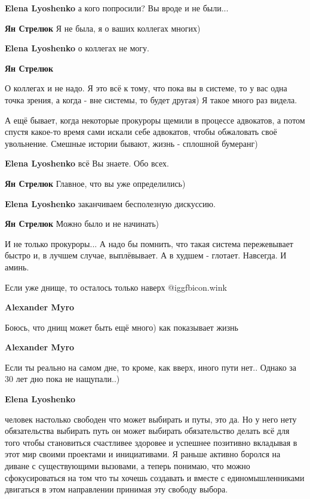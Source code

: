 \begin{itemize}
\begin{itemize}
\textbf{Elena Lyoshenko} а кого попросили? Вы вроде и не были...

\textbf{Ян Стрелюк}
Я не была, я о ваших коллегах многих)

\textbf{Elena Lyoshenko} о коллегах не могу.

\textbf{Ян Стрелюк}

О коллегах и не надо. Я это всё к тому, что пока вы в системе, то у вас одна
точка зрения, а когда - вне системы, то будет другая) Я такое много раз видела.

А ещё бывает, когда некоторые прокуроры щемили в процессе адвокатов, а потом
спустя какое-то время сами искали себе адвокатов, чтобы обжаловать своё
увольнение. Смешные истории бывают, жизнь - сплошной бумеранг)

\textbf{Elena Lyoshenko} всё Вы знаете. Обо всех.

\textbf{Ян Стрелюк}
Главное, что вы уже определились)

\textbf{Elena Lyoshenko} заканчиваем бесполезную дискуссию.

\textbf{Ян Стрелюк}
Можно было и не начинать)

И не только прокуроры...
А надо бы помнить, что такая система пережевывает быстро и, в лучшем случае, выплёвывает. А в худшем - глотает. Навсегда. И аминь.

\end{itemize} %


Если уже днище, то осталось только наверх  @igg{fbicon.wink} 

\begin{itemize} %
\textbf{Alexander Myro}

Боюсь, что днищ может быть ещё много) как показывает жизнь

\textbf{Alexander Myro}

Если ты реально на самом дне, то кроме, как вверх, иного пути нет..
Однако за 30 лет дно пока не нащупали..)

\textbf{Elena Lyoshenko} 

человек настолько свободен что может выбирать и путы, это да. Но у него нету
обязательства выбирать путь он может выбирать обязательство делать всё для того
чтобы становиться счастливее здоровее и успешнее позитивно вкладывая в этот мир
своими проектами и инициативами. Я раньше активно боролся на диване с
существующими вызовами, а теперь понимаю, что можно сфокусироваться на том что
ты хочешь создавать и вместе с единомышленниками двигаться в этом направлении
принимая эту свободу выбора.



\end{itemize}
\end{itemize}

